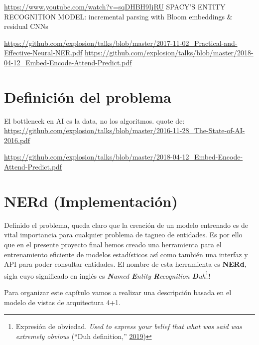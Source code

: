 \documentclass[12pt,a4paper,]{scrartcl}
\let\rmarkdownfootnote\footnote%
\def\footnote{\protect\rmarkdownfootnote}
\begin{document}
\url{https://www.youtube.com/watch?v=sqDHBH9IjRU}
SPACY'S ENTITY RECOGNITION MODEL: incremental parsing with Bloom embeddings \& residual CNNs

\url{https://github.com/explosion/talks/blob/master/2017-11-02_Practical-and-Effective-Neural-NER.pdf}
\url{https://github.com/explosion/talks/blob/master/2018-04-12_Embed-Encode-Attend-Predict.pdf}

\hypertarget{problem-definition}{%
\section{Definición del problema}\label{problem-definition}}

El bottleneck en AI es la data, no los algoritmos.
quote de: \url{https://github.com/explosion/talks/blob/master/2016-11-28_The-State-of-AI-2016.pdf}

\url{https://github.com/explosion/talks/blob/master/2018-04-12_Embed-Encode-Attend-Predict.pdf}

\hypertarget{implementation}{%
\section{NERd (Implementación)}\label{implementation}}

Definido el problema, queda claro que la creación de un modelo entrenado es de vital importancia para cualquier problema de tagueo de entidades.
Es por ello que en el presente proyecto final hemos creado una herramienta para el entrenamiento eficiente de modelos estadísticos así como también una interfaz y API para poder consultar entidades.
El nombre de esta herramienta es \textbf{NERd}, sigla cuyo significado en inglés es \emph{\textbf{N}amed \textbf{E}ntity \textbf{R}ecognition \textbf{D}uh}\footnote{Expresión de obviedad. \emph{Used to express your belief that what was said was extremely obvious} (``Duh definition,'' \protect\hyperlink{ref-cambridge_duh}{2019})}!

Para organizar este capítulo vamos a realizar una descripción basada en el modelo de vistas de arquitectura 4+1.
\end{document}
